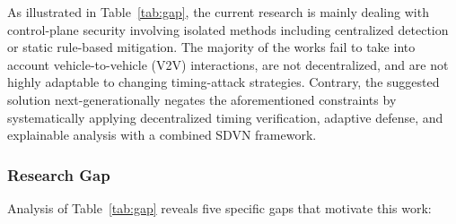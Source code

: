 As illustrated in Table~\ref{tab:gap}, the current research is mainly dealing with control-plane security involving isolated methods including centralized detection or static rule-based mitigation. The majority of the works fail to take into account vehicle-to-vehicle (V2V) interactions, are not decentralized, and are not highly adaptable to changing timing-attack strategies. Contrary, the suggested solution next-generationally negates the aforementioned constraints by systematically applying decentralized timing verification, adaptive defense, and explainable analysis with a combined SDVN framework.

\subsubsection{Research Gap}

Analysis of Table~\ref{tab:gap} reveals five specific gaps that motivate
this work:

